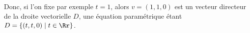{\begin{enumerate}
{Donc, si l'on fixe par exemple $t=1$, alors $v=(1,1,0)$ 
est un vecteur directeur de la droite vectorielle $D$,
une équation paramétrique étant $D=\{(t,t,0) \mid t\in \Rr \}$.}
\end{enumerate}
}
